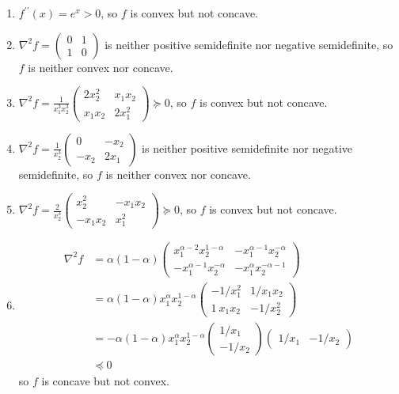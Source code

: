 \begin{problem}[3.16]
    \Answer \text{}\begin{enumerate}
        \item $f^{\prime\prime}(x) = e^x > 0$, so $f$ is convex but not concave.
        \item $\nabla^2 f = \begin{pmatrix}
            0 & 1 \\
            1 & 0
        \end{pmatrix}$ is neither positive semidefinite nor negative semidefinite, so $f$ is neither convex nor concave.
        \item $\nabla^2f = \frac{1}{x_1^3x_2^3}\begin{pmatrix}
            2x_2^2 & x_1x_2 \\
            x_1x_2 & 2x_1^2
        \end{pmatrix} \succeq 0$, so $f$ is convex but not concave.
        \item $\nabla^2f = \frac{1}{x_2^3}\begin{pmatrix}
            0 & -x_2\\
            -x_2 & 2x_1
        \end{pmatrix}$ is neither positive semidefinite nor negative semidefinite, so $f$ is neither convex nor concave.
        \item $\nabla^2f = \frac{2}{x_2^3}\begin{pmatrix}
            x_2^2 & -x_1x_2 \\
            -x_1x_2 & x_1^2
        \end{pmatrix} \succeq 0$, so $f$ is convex but not concave.
        \item \begin{align*}    
            \nabla^2f &= \alpha(1 - \alpha)\begin{pmatrix}
                x_1^{\alpha - 2}x_2^{1 - \alpha} & -x_1^{\alpha - 1}x_2^{-\alpha}\\
                -x_1^{\alpha - 1}x_2^{-\alpha} & -x_1^\alpha x_2^{-\alpha - 1}
            \end{pmatrix}\\ 
            &=\alpha(1 - \alpha)x_1^{\alpha}x_2^{1 - \alpha}\begin{pmatrix}
                -1 / x_1^2 & 1 / x_1x_2 \\
                1 \ x_1x_2 & -1 / x_2^2
            \end{pmatrix}\\
            &=-\alpha(1 - \alpha)x_1^{\alpha}x_2^{1 - \alpha}\begin{pmatrix}
                1 / x_1 \\
                -1 / x_2
            \end{pmatrix}\begin{pmatrix}
                1 / x_1 & -1 / x_2
            \end{pmatrix}\\
            &\preceq 0
        \end{align*}
        so $f$ is concave but not convex.
    \end{enumerate}
\end{problem}


